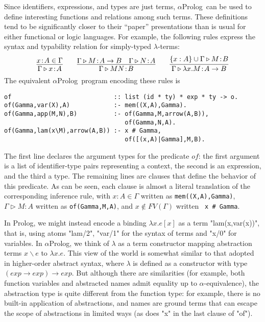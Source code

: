 \documentclass[draft,12pt]{report}
\newcommand{\aprolog}{$\alpha${Prolog}\xspace}
\begin{document}
Since identifiers, expressions, and types are just terms, \aprolog\ 
can be used to define interesting functions and relations among such
terms.  These definitions tend to be significantly closer to their
``paper'' presentations than is usual for either functional or logic
languages.  For example, the following rules express the syntax and
typability relation for simply-typed $\lambda$-terms:
%
\[
\infer{\Gamma\triangleright x\!:\!A}{x\!:\!A\in\Gamma}
\qquad\infer{\Gamma\triangleright M N\!:\!B} {\Gamma\triangleright
  M\!:\!A\to B & \Gamma\triangleright N\!:\!A}
\qquad\infer{\Gamma\triangleright \lambda x.M\!:\!A\to B}
{\{x:A\}\cup\Gamma\triangleright M\!:\!B}
\]
%
The equivalent \aprolog\ program encoding these rules is
\begin{center}
\begin{verbatim}
of                            :: list (id * ty) * exp * ty -> o.
of(Gamma,var(X),A)            :- mem((X,A),Gamma).
of(Gamma,app(M,N),B)          :- of(Gamma,M,arrow(A,B)),
                                 of(Gamma,N,A).
of(Gamma,lam(x\M),arrow(A,B)) :- x # Gamma, 
                                 of([(x,A)|Gamma],M,B).
\end{verbatim}
\end{center}
The first line declares the argument types for the predicate $of$: the
first argument is a list of identifier-type pairs representing a
context, the second is an expression, and the third a type.  The
remaining lines are clauses that define the behavior of this
predicate.  As can be seen, each clause is almost a literal
translation of the corresponding inference rule, with $x:A \in \Gamma$
written as {\tt mem((X,A),Gamma)}, $\Gamma\triangleright M\!:\!A$
written as {\tt of(Gamma,M,A)}, and $x \notin FV(\Gamma)$ written {\tt
  x \# Gamma}.


In Prolog, we might instead encode a binding $\lambda x.e[x]$ as a
term "lam(x,var(x))", that is, using atoms "lam/2", 
"var/1" for the syntax of terms and "x/0" for variables.  
In \aprolog, we think of $\lambda$ as
a term constructor mapping abstraction terms $x\backslash e$ to
$\lambda x.e$.  This view of the world is somewhat similar to that
adopted in higher-order abstract syntax, where $\lambda$ is defined as a constructor with type $(exp \to exp) \to
exp$.  But although there are similarities (for example, both function
variables and abstracted names admit equality up to
$\alpha$-equivalence), the abstraction type is quite different from the
function type: for example, there is no built-in application of
abstractions, and names are ground terms that can escape the scope of
abstractions in limited ways (as does "x" in the last clause of "of").
\end{document}
